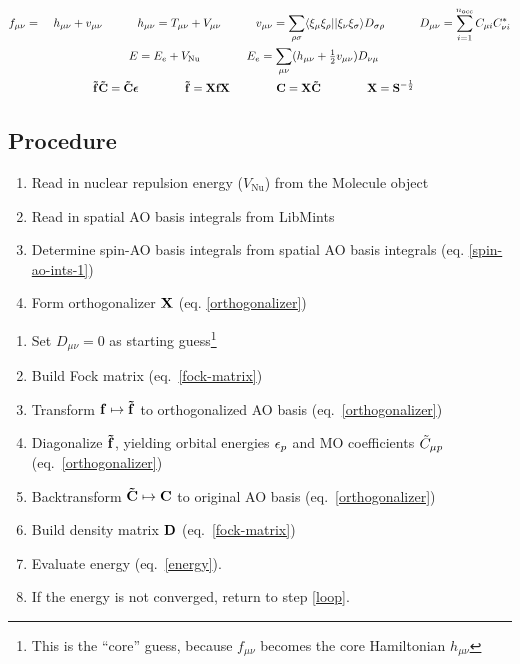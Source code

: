 \documentclass[fleqn]{article}
\begin{document}
\noindent
{}
\begin{gather}
\begin{aligned}
\label{fock-matrix}
&
  f_{\mu\nu}
=&\
  h_{\mu\nu}
+
  v_{\mu\nu}
\hspace{30pt}
  h_{\mu\nu}
=
  T_{\mu\nu}+V_{\mu\nu}
\hspace{30pt}
  v_{\mu\nu}
=
  \sum_{\rho\sigma}
  \langle\xi_\mu\xi_\rho||\xi_\nu\xi_\sigma\rangle
  D_{\sigma\rho}
\hspace{30pt}
  D_{\mu\nu}
=
  \sum_{i=1}^{n_\text{occ}}
  C_{\mu i} C_{\nu i}^*
\end{aligned}\\
\begin{aligned}
\label{energy}
&
  E
=
  E_e
+
  V_\mathrm{Nu}
&&\hspace{30pt}
  E_e
=
  \sum_{\mu\nu}
  (h_{\mu\nu}+\tfrac{1}{2}v_{\mu\nu})D_{\nu\mu}
\end{aligned}\\
\begin{aligned}
\label{orthogonalizer}
&
  \mathbf{\tilde{f}}\mathbf{\tilde{C}}
=
  \mathbf{\tilde{C}}\bm{\epsilon}
&&\hspace{30pt}
  \mathbf{\tilde{f}}
=
  \mathbf{X}\mathbf{f}\mathbf{X}
&&\hspace{30pt}
  \mathbf{C}
=
  \mathbf{X}
  \mathbf{\tilde{C}}
&&\hspace{30pt}
  \mathbf{X}
=
  \mathbf{S}^{-\frac{1}{2}}
\end{aligned}
\end{gather}


\subsection*{Procedure}

\begin{enumerate}
  \item Read in nuclear repulsion energy ($V_\mathrm{Nu}$) from the Molecule object
  \item Read in spatial AO basis integrals from LibMints
  \item Determine spin-AO basis integrals from spatial AO basis integrals (eq. \ref{spin-ao-ints-1})
  \item Form orthogonalizer $\mathbf{X}$ (eq. \ref{orthogonalizer})
\end{enumerate}

\noindent
{}
\begin{enumerate}
  \item Set $D_{\mu\nu}=0$ as starting guess\footnote{This is the ``core'' guess, because $f_{\mu\nu}$ becomes the core Hamiltonian $h_{\mu\nu}$}
  \item\label{loop} Build Fock matrix (eq.~\ref{fock-matrix})
  \item Transform $\mathbf{f}\mapsto\mathbf{\tilde{f}}$ to orthogonalized AO basis (eq.~\ref{orthogonalizer})
  \item Diagonalize $\mathbf{\tilde{f}}$, yielding orbital energies $\epsilon_p$ and MO coefficients $\tilde{C}_{\mu p}$ (eq.~\ref{orthogonalizer})
  \item Backtransform $\mathbf{\tilde{C}}\mapsto\mathbf{C}$ to original AO basis (eq.~\ref{orthogonalizer})
  \item Build density matrix $\mathbf{D}$ (eq.~\ref{fock-matrix})
  \item Evaluate energy (eq.~\ref{energy}).
  \item If the energy is not converged, return to step \ref{loop}.
\end{enumerate}
\end{document}
